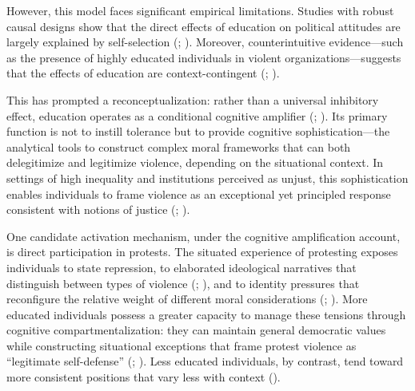 \documentclass[
  13pt,
]{article}
\begin{document}
However, this model faces significant empirical limitations. Studies
with robust causal designs show that the direct effects of education on
political attitudes are largely explained by self-selection
(;
).
Moreover, counterintuitive evidence---such as the presence of highly
educated individuals in violent organizations---suggests that the
effects of education are context-contingent
(;
).

This has prompted a reconceptualization: rather than a universal
inhibitory effect, education operates as a conditional cognitive
amplifier (;
). Its
primary function is not to instill tolerance but to provide cognitive
sophistication---the analytical tools to construct complex moral
frameworks that can both delegitimize and legitimize violence, depending
on the situational context. In settings of high inequality and
institutions perceived as unjust, this sophistication enables
individuals to frame violence as an exceptional yet principled response
consistent with notions of justice
(;
).

One candidate activation mechanism, under the cognitive amplification
account, is direct participation in protests. The situated experience of
protesting exposes individuals to state repression, to elaborated
ideological narratives that distinguish between types of violence
(;
), and to
identity pressures that reconfigure the relative weight of different
moral considerations (; ). More educated individuals possess a greater
capacity to manage these tensions through cognitive
compartmentalization: they can maintain general democratic values while
constructing situational exceptions that frame protest violence as
``legitimate self-defense'' (; ). Less educated individuals, by contrast, tend toward more
consistent positions that vary less with context
().
\end{document}
